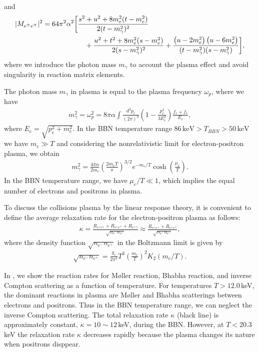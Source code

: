 and
\begin{align}
|M_{e^\pm e^\mp}|^{2}=64\pi^{2}\alpha^{2}
\bigg[&\frac{s^{2}+u^{2}+8m_e^{2}(t-m_e^{2})}{2(t-m^2_{\gamma})^{2}}\notag\\
&\quad+\frac{u^{2}+t^{2}+8m_e^{2}
(s-m_e^{2})}{2(s-m^2_{\gamma})^{2}}  +   \frac{\left({u}-2m_e^{2}\right)\left({u}-6m_e^{2}\right)}
   {(t-m^2_{\gamma})(s-m^2_{\gamma})} \bigg],
\label{M_fi_b}
\end{align}
where we introduce the photon mass $m_\gamma$ to account the plasma effect and avoid singularity in reaction matrix elements. 

The photon mass $m_\gamma$ in plasma is equal to the plasma frequency $\omega_p$, where we have~\cite{Kislinger:1975uy}
\begin{align}
m^2_\gamma=\omega^2_{p}=8\pi\alpha\int\frac{d^3p_e}{(2\pi)^3}\left(1-\frac{p_e^2}{3E_e^2}\right)\frac{f_e+f_{\bar e}}{E_e},
\end{align}
where $E_e=\sqrt{p_e^2+m^2_e}$. In the BBN temperature range $86\,\mathrm{keV}>T_{BBN}>50\,\mathrm{keV}$ we have $m_e\gg T$ and considering the nonrelativistic limit for electron-positron plasma, we obtain
\begin{align}
m^2_\gamma=\frac{4\pi\alpha}{2m_e}\left(\frac{2m_eT}{\pi}\right)^{3/2}e^{-m_e/T}\cosh\left(\frac{\mu_e}{T}\right).
\end{align}
In the BBN temperature range, we have $\mu_e/T\ll1$, which implies the equal number of electrons and positrons in plasma.

To discuss the collisions plasma by the linear response theory, it is convenient to define the average relaxation rate for the electron-positron plasma as follows:
\begin{align}\label{Kappa}
\kappa=\frac{R_{e^\pm e^\pm}+R_{e^\pm e^\mp}+R_{e^\pm\gamma}}{\sqrt{n_{e^-}n_{e^+}}}\approx\frac{R_{e^\pm e^\pm}+R_{e^\pm e^\mp}}{\sqrt{n_{e^-}n_{e^+}}},
\end{align}
where the density function ${\sqrt{n_{e^-}n_{e^+}}}$ in the Boltzmann limit is given by
\begin{align}
{\sqrt{n_{e^-}n_{e^+}}}=\frac{g_e}{2\pi^3}T^3\left(\frac{m_e}{T}\right)^2K_2(m_e/T).
\end{align}

In , we show the reaction rates for M{\o}ller reaction, Bhabha reaction, and inverse Compton scattering as a function of temperature. For temperatures $T>12.0$\,keV, the dominant reactions in plasma are M{\o}ller and Bhabha scatterings between electrons and positrons. Thus in the BBN temperature range, we can neglect the inverse Compton scattering. The total relaxation rate $\kappa$ (black line) is approximately constant, $\kappa=10\sim12$\,keV, during the BBN. However, at $T<20.3$\,keV the relaxation rate $\kappa$ decreases rapidly because the plasma changes its nature when positrons disppear.

